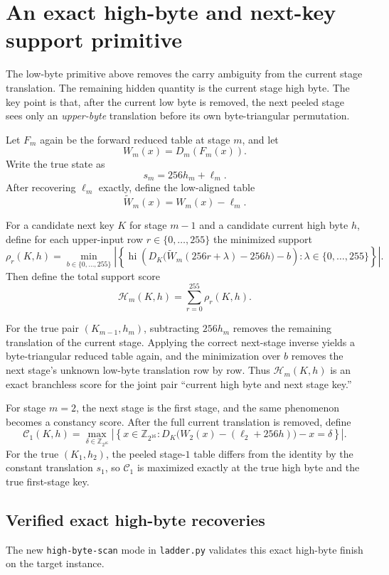 \documentclass[11pt]{article}
\begin{document}
\section{An exact high-byte and next-key support primitive}
The low-byte primitive above removes the carry ambiguity from the current stage translation. The remaining hidden quantity is the current stage high byte. The key point is that, after the current low byte is removed, the next peeled stage sees only an \emph{upper-byte} translation before its own byte-triangular permutation.

Let $F_m$ again be the forward reduced table at stage $m$, and let
\[
W_m(x)=D_m(F_m(x)).
\]
Write the true state as
\[
s_m = 256h_m + \ell_m.
\]
After recovering $\ell_m$ exactly, define the low-aligned table
\[
\widetilde{W}_m(x)=W_m(x)-\ell_m.
\]

For a candidate next key $K$ for stage $m-1$ and a candidate current high byte $h$, define for each upper-input row $r\in\{0,\dots,255\}$ the minimized support
\[
\rho_r(K,h)=
\min_{b\in\{0,\dots,255\}}
\left|
\left\{
\operatorname{hi}\!\left(
D_K\!\bigl(\widetilde{W}_m(256r+\lambda)-256h\bigr)-b
\right)
:\lambda\in\{0,\dots,255\}
\right\}
\right|.
\]
Then define the total support score
\[
\mathcal{H}_m(K,h)=\sum_{r=0}^{255}\rho_r(K,h).
\]

For the true pair $(K_{m-1},h_m)$, subtracting $256h_m$ removes the remaining translation of the current stage. Applying the correct next-stage inverse yields a byte-triangular reduced table again, and the minimization over $b$ removes the next stage's unknown low-byte translation row by row. Thus $\mathcal{H}_m(K,h)$ is an exact branchless score for the joint pair ``current high byte and next stage key.''

For stage $m=2$, the next stage is the first stage, and the same phenomenon becomes a constancy score. After the full current translation is removed, define
\[
\mathcal{C}_1(K,h)=
\max_{\delta\in\mathbb{Z}_{2^{16}}}
\left|
\left\{
x\in\mathbb{Z}_{2^{16}}:
D_K\!\bigl(W_2(x)-(\ell_2+256h)\bigr)-x=\delta
\right\}
\right|.
\]
For the true $(K_1,h_2)$, the peeled stage-$1$ table differs from the identity by the constant translation $s_1$, so $\mathcal{C}_1$ is maximized exactly at the true high byte and the true first-stage key.

\subsection*{Verified exact high-byte recoveries}
The new \texttt{high-byte-scan} mode in \texttt{ladder.py} validates this exact high-byte finish on the target instance.
\end{document}
